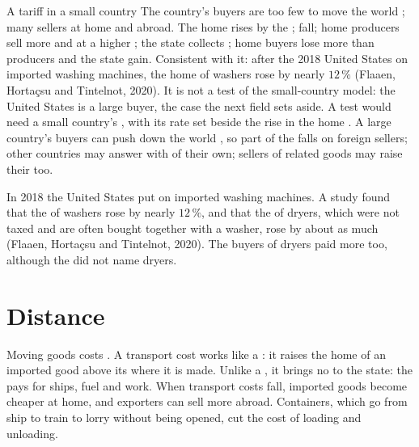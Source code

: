 \begin{model}{A tariff in a small country}
\assumes The country's buyers are too few to move the world ; many sellers at home and abroad.
\predicts The home  rises by the ;  fall; home producers sell more and at a higher
; the state collects ; home buyers lose more than producers and the state gain.
\tested Consistent with it: after the 2018 United States  on imported washing machines, the home
 of washers rose by nearly $12\,\%$ (Flaaen, Hortaçsu and Tintelnot, 2020). It is not a test of the
small-country model: the United States is a large buyer, the case the next field sets aside. A test
would need a small country's , with its rate set beside the rise in the home .
\breaks A large country's buyers can push down the world , so part of the  falls on foreign
sellers; other countries may answer with  of their own; sellers of related goods may raise their
 too.
\end{model}

\begin{record}
In 2018 the United States put  on imported washing machines. A study found that the  of
washers rose by nearly $12\,\%$, and that the  of dryers, which were not taxed and are often bought
together with a washer, rose by about as much (Flaaen, Hortaçsu and Tintelnot, 2020). The
buyers of dryers paid more too, although the  did not name dryers.
\end{record}

\section{Distance}

Moving goods costs . A transport cost works like a : it raises the home  of an imported
good above its  where it is made. Unlike a , it brings no  to the state: the  pays
for ships, fuel and work. When transport costs fall, imported goods become cheaper at home, and exporters
can sell more abroad. Containers, which go from ship to train to lorry without being opened, cut the cost
of loading and unloading.

